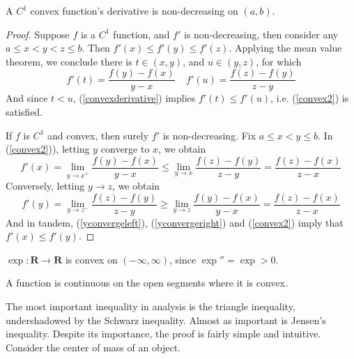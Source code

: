 \begin{lemma}
    A $C^1$ convex function's derivative is non-decreasing on $(a,b)$.
\end{lemma}
\begin{proof}
    Suppose $f$ is a $C^1$ function, and $f'$ is non-decreasing, then consider any $a \leq x < y < z \leq b$. Then $f'(x) \leq f'(y) \leq f'(z)$. Applying the mean value theorem, we conclude there is $t \in (x,y)$, and $u \in (y,z)$, for which
    \begin{equation} \label{convexderivative} f'(t) = \frac{f(y) - f(x)}{y - x}\ \ \ \ \ f'(u) = \frac{f(z) - f(y)}{z - y} \end{equation}
    And since $t < u$, (\ref{convexderivative}) implies $f'(t) \leq f'(u)$, i.e. (\ref{convex2}) is satisfied.

    If $f$ is $C^1$ and convex, then surely $f'$ is non-decreasing. Fix $a \leq x < y \leq b$. In (\ref{convex2})), letting $y$ converge to $x$, we obtain
    \begin{equation} \label{yconvergeleft} f'(x) = \lim_{y \to x^+} \frac{f(y) - f(x)}{y - x} \leq \lim_{y \to x} \frac{f(z) - f(y)}{z - y} = \frac{f(z) - f(x)}{z - x} \end{equation}
    Conversely, letting $y \to z$, we obtain
    \begin{equation} \label{yconvergeright} f'(y) = \lim_{y \to z^-} \frac{f(z) - f(y)}{z - y} \geq \lim_{y \to z} \frac{f(y) - f(x)}{y - x} = \frac{f(z) - f(x)}{z - x} \end{equation}
    And in tandem, (\ref{yconvergeleft}), (\ref{yconvergeright}) and (\ref{convex2}) imply that $f'(x) \leq f'(y)$.
\end{proof}

\begin{example}
    $\exp: \mathbf{R} \to \mathbf{R}$ is convex on $(-\infty, \infty)$, since $\exp'' = \exp > 0$.
\end{example}

\begin{lemma}
    A function is continuous on the open segments where it is convex.
\end{lemma}

The most important inequality in analysis is the triangle inequality, undershadowed by the Schwarz inequality. Almost as important is Jensen's inequality. Despite its importance, the proof is fairly simple and intuitive. Consider the center of mass of an object.

